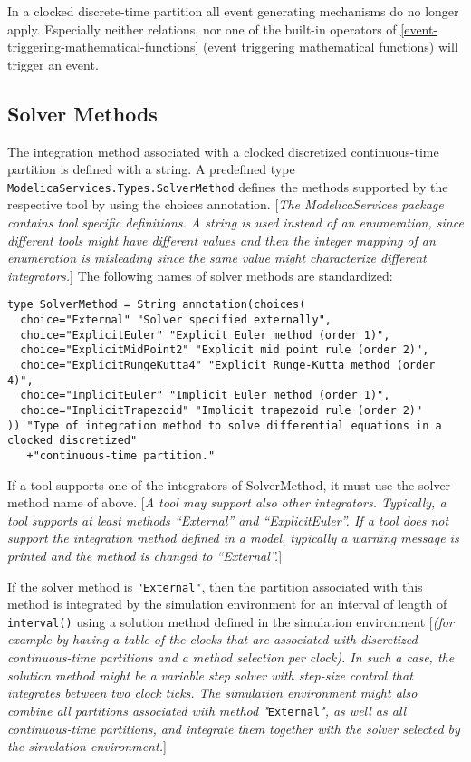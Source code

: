 In a clocked discrete-time partition all event generating mechanisms do
no longer apply. Especially neither relations, nor one of the built-in
operators of \autoref{event-triggering-mathematical-functions} (event triggering mathematical functions)
will trigger an event.

\subsection{Solver Methods}

The integration method associated with a clocked discretized
continuous-time partition is defined with a string. A predefined type
\lstinline!ModelicaServices.Types.SolverMethod! defines the methods supported by the
respective tool by using the choices annotation. {[}\emph{The
ModelicaServices package contains tool specific definitions. A string is
used instead of an enumeration, since different tools might have
different values and then the integer mapping of an enumeration is
misleading since the same value might characterize different
integrators.}{]} The following names of solver methods are standardized:

\begin{lstlisting}[language=modelica]
type SolverMethod = String annotation(choices(
  choice="External" "Solver specified externally",
  choice="ExplicitEuler" "Explicit Euler method (order 1)",
  choice="ExplicitMidPoint2" "Explicit mid point rule (order 2)",
  choice="ExplicitRungeKutta4" "Explicit Runge-Kutta method (order 4)",
  choice="ImplicitEuler" "Implicit Euler method (order 1)",
  choice="ImplicitTrapezoid" "Implicit trapezoid rule (order 2)"
)) "Type of integration method to solve differential equations in a clocked discretized"
   +"continuous-time partition."
\end{lstlisting}

If a tool supports one of the integrators of SolverMethod, it must use
the solver method name of above. {[}\emph{A tool may support also other
integrators. Typically, a tool supports at least methods ``External''
and ``ExplicitEuler''. If a tool does not support the integration method
defined in a model, typically a warning message is printed and the
method is changed to ``External''.}{]}

If the solver method is \lstinline!"External"!, then the partition associated with
this method is integrated by the simulation environment for an interval
of length of \lstinline!interval()! using a solution method defined in the
simulation environment {[}\emph{(for example by having a table of the
clocks that are associated with discretized continuous-time partitions
and a method selection per clock). In such a case, the solution method
might be a variable step solver with step-size control that integrates
between two clock ticks. The simulation environment might also combine
all partitions associated with method "}\lstinline!External!\emph{", as well as all
continuous-time partitions, and integrate them together with the solver
selected by the simulation environment.}{]}

